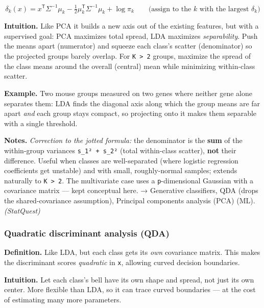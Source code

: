 \documentclass[
  10pt,
  letterpaper,
  onecolumn]{article}
\begin{document}
\begin{equation*}
\delta_k(x)=x^{\mathsf T}\Sigma^{-1}\mu_k-\tfrac12\mu_k^{\mathsf T}\Sigma^{-1}\mu_k+\log\pi_k
\qquad\text{(assign to the }k\text{ with the largest }\delta_k)
\end{equation*}

\textbf{Intuition.} Like PCA it builds a new axis out of the existing
features, but with a supervised goal: PCA maximizes total spread, LDA
maximizes \emph{separability}. Push the means apart (numerator) and
squeeze each class's scatter (denominator) so the projected groups
barely overlap. For \texttt{K\ \textgreater{}\ 2} groups, maximize the
spread of the class means around the overall (central) mean while
minimizing within-class scatter.

\textbf{Example.} Two mouse groups measured on two genes where neither
gene alone separates them: LDA finds the diagonal axis along which the
group means are far apart \emph{and} each group stays compact, so
projecting onto it makes them separable with a single threshold.

\textbf{Notes.} \emph{Correction to the jotted formula:} the denominator
is the \textbf{sum} of the within-group variances
\texttt{s\_1²\ +\ s\_2²} (total within-class scatter), \textbf{not}
their difference. Useful when classes are well-separated (where logistic
regression coefficients get unstable) and with small, roughly-normal
samples; extends naturally to \texttt{K\ \textgreater{}\ 2}. The
multivariate case uses a \texttt{p}-dimensional Gaussian with a
covariance matrix --- kept conceptual here. → Generative classifiers,
QDA (drops the shared-covariance assumption), Principal components
analysis (PCA) (ML). \emph{(StatQuest)}

\hypertarget{quadratic-discriminant-analysis-qda}{%
\subsubsection{Quadratic discriminant analysis
(QDA)}\label{quadratic-discriminant-analysis-qda}}

\textbf{Definition.} Like LDA, but each class gets its \emph{own}
covariance matrix. This makes the discriminant scores \emph{quadratic}
in \texttt{x}, allowing curved decision boundaries.

\textbf{Intuition.} Let each class's bell have its own shape and spread,
not just its own center. More flexible than LDA, so it can trace curved
boundaries --- at the cost of estimating many more parameters.
\end{document}
